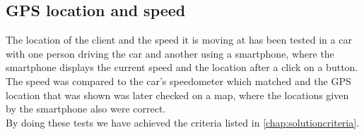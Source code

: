 \subsection{GPS location and speed}
The location of the client and the speed it is moving at has been tested in a car with one person driving the car and another using a smartphone, where the smartphone displays the current speed and the location after a click on a button. The speed was compared to the car's speedometer which matched and the GPS location that was shown was later checked on a map, where the locations given by the smartphone also were correct.
\\
By doing these tests we have achieved the criteria listed in \autoref{chap:solutioncriteria}.